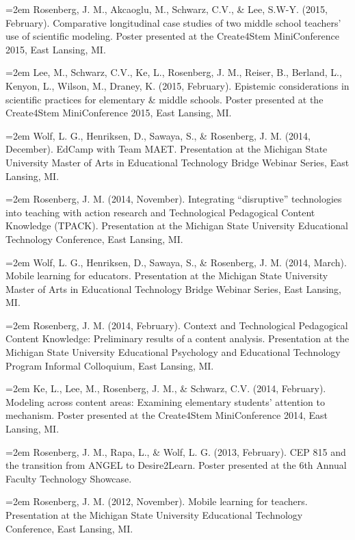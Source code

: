\documentclass[]{article}
\begin{document}
\hangindent=2em Rosenberg, J. M., Akcaoglu, M., Schwarz, C.V., \& Lee,
S.W-Y. (2015, February). Comparative longitudinal case studies of two
middle school teachers' use of scientific modeling. Poster presented at
the Create4Stem MiniConference 2015, East Lansing, MI.

\hangindent=2em Lee, M., Schwarz, C.V., Ke, L., Rosenberg, J. M.,
Reiser, B., Berland, L., Kenyon, L., Wilson, M., Draney, K. (2015,
February). Epistemic considerations in scientific practices for
elementary \& middle schools. Poster presented at the Create4Stem
MiniConference 2015, East Lansing, MI.

\hangindent=2em Wolf, L. G., Henriksen, D., Sawaya, S., \& Rosenberg, J.
M. (2014, December). EdCamp with Team MAET. Presentation at the Michigan
State University Master of Arts in Educational Technology Bridge Webinar
Series, East Lansing, MI.

\hangindent=2em Rosenberg, J. M. (2014, November). Integrating
``disruptive'' technologies into teaching with action research and
Technological Pedagogical Content Knowledge (TPACK). Presentation at the
Michigan State University Educational Technology Conference, East
Lansing, MI.

\hangindent=2em Wolf, L. G., Henriksen, D., Sawaya, S., \& Rosenberg, J.
M. (2014, March). Mobile learning for educators. Presentation at the
Michigan State University Master of Arts in Educational Technology
Bridge Webinar Series, East Lansing, MI.

\hangindent=2em Rosenberg, J. M. (2014, February). Context and
Technological Pedagogical Content Knowledge: Preliminary results of a
content analysis. Presentation at the Michigan State University
Educational Psychology and Educational Technology Program Informal
Colloquium, East Lansing, MI.

\hangindent=2em Ke, L., Lee, M., Rosenberg, J. M., \& Schwarz, C.V.
(2014, February). Modeling across content areas: Examining elementary
students' attention to mechanism. Poster presented at the Create4Stem
MiniConference 2014, East Lansing, MI.

\hangindent=2em Rosenberg, J. M., Rapa, L., \& Wolf, L. G. (2013,
February). CEP 815 and the transition from ANGEL to Desire2Learn. Poster
presented at the 6th Annual Faculty Technology Showcase.

\hangindent=2em Rosenberg, J. M. (2012, November). Mobile learning for
teachers. Presentation at the Michigan State University Educational
Technology Conference, East Lansing, MI.
\end{document}
